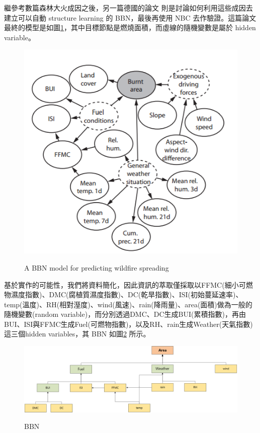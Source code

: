 \documentclass[a4paper]{article}
\begin{document}
繼參考數篇森林大火成因之後，另一篇德國的論文 \cite{BBN}則是討論如何利用這些成因去建立可以自動 structure learning 的 BBN\cite{Model}，最後再使用 NBC 去作驗證。這篇論文最終的模型是如圖\ref{bbn_proto}，其中目標節點是燃燒面積，而虛線的隨機變數是屬於 hidden variable。

\begin{figure}[h]
  \caption{A BBN model for predicting wildfire spreading}
  \centering
  \includegraphics[width=.78\textwidth]{bbn_proto}
  \label{bbn_proto}
\end{figure}

基於實作的可能性，我們將資料簡化，因此資訊的萃取僅採取以FFMC(細小可燃物濕度指數)、DMC(腐植質濕度指數)、DC(乾旱指數)、ISI(初始蔓延速率)、temp(溫度)、RH(相對溼度)、wind(風速)、rain(降雨量)、area(面積)做為一般的隨機變數(random variable)，而分別透過DMC、DC生成BUI(累積指數)，再由BUI、ISI與FFMC生成Fuel(可燃物指數)，以及RH、rain生成Weather(天氣指數)這三個hidden variables，其 BBN 如圖\ref{bbn} 所示。


\begin{figure}[h]
  \caption{BBN}
  \centering
  \includegraphics[width=1\textwidth]{bbn}
  \label{bbn}
\end{figure}
\end{document}
